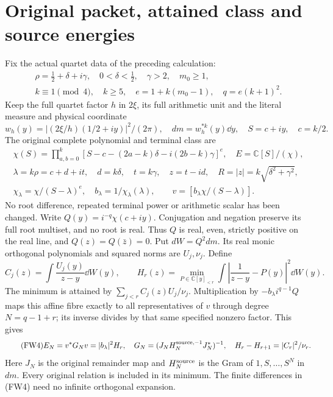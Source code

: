 \documentclass[11pt]{article}
\newcommand{\C}{\mathbb C}\newcommand{\R}{\mathbb R}
\begin{document}
\section{Original packet, attained class and source energies}
Fix the actual quartet data of the preceding calculation:
\begin{equation}\tag{FW1}
 \begin{gathered}
 \rho=\tfrac12+\delta+i\gamma,\quad 0<\delta<\tfrac12,\quad
 \gamma>2,\quad m_0\ge1,\\
 k\equiv1\pmod4,\quad k\ge5,\quad
 e=1+k(m_0-1),\quad q=e(k+1)^2.
 \end{gathered}
\end{equation}
Keep the full quartet factor $h$ in $2\xi$, its full arithmetic unit and
the literal measure and physical coordinate
\[
 w_h(y)=|(2\xi/h)(1/2+iy)|^2/(2\pi),\quad
 dm=w_h^{*k}(y)\dd y,\quad S=c+iy,\quad c=k/2.
\]
The original complete polynomial and terminal class are
\begin{equation}\tag{FW2}
 \begin{gathered}
 \chi(S)=\prod_{a,b=0}^k[S-c-(2a-k)\delta-i(2b-k)\gamma]^e,
 \quad E=\C[S]/(\chi),\\
 \lambda=k\rho=c+d+it,\quad d=k\delta,\quad t=k\gamma,
 \quad z=t-id,\quad R=|z|=k\sqrt{\delta^2+\gamma^2},\\
 \chi_\lambda=\chi/(S-\lambda)^e,\quad b_\lambda=1/\chi_\lambda(\lambda),
 \qquad v=[b_\lambda\chi/(S-\lambda)].
 \end{gathered}
\end{equation}
No root difference, repeated terminal power or arithmetic scalar has been
changed. Write $Q(y)=i^{-q}\chi(c+iy)$. Conjugation and negation preserve
its full root multiset, and no root is real. Thus $Q$ is real, even,
strictly positive on the real line, and $Q(z)=Q(\bar z)=0$.
Put $dW=Q^2dm$. Its real monic orthogonal polynomials and squared norms
are $U_j,\nu_j$. Define
\begin{equation}\tag{FW3}
 C_j(z)=\int\frac{U_j(y)}{z-y}\dd W(y),\qquad
 H_r(z)=\min_{P\in\C[y]_{<r}}\int\left|\frac1{z-y}-P(y)\right|^2\dd W(y).
\end{equation}
The minimum is attained by $\sum_{j<r}C_j(z)U_j/\nu_j$.
Multiplication by $-b_\lambda i^{q-1}Q$ maps this affine fibre exactly
to all representatives of $v$ through degree $N=q-1+r$; its inverse
divides by that same specified nonzero factor. This gives
\begin{equation}\tag{FW4}
 E_N=v^*G_Nv=|b_\lambda|^2H_r,
 \quad G_N=(J_NH_N^{\rm source,-1}J_N^*)^{-1},
 \quad H_r-H_{r+1}=|C_r|^2/\nu_r.
\end{equation}
Here $J_N$ is the original remainder map and $H_N^{\rm source}$ is the
Gram of $1,S,\ldots,S^N$ in $dm$. Every original relation is included
in its minimum. The finite differences in (FW4) need no infinite
orthogonal expansion.
\end{document}
